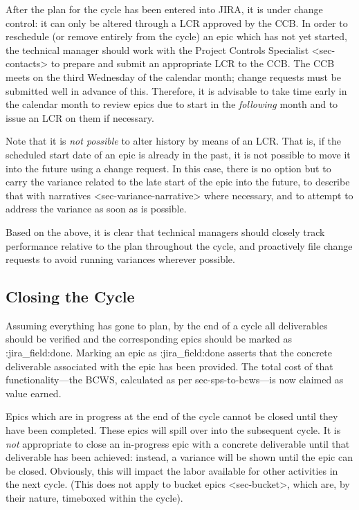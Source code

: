 After the plan for the cycle has been entered into JIRA, it is under
change control: it can only be altered through a LCR approved by the
CCB. In order to reschedule (or remove entirely from the cycle) an epic
which has not yet started, the technical manager should work with the
Project Controls Specialist \textless{}sec-contacts\textgreater{} to
prepare and submit an appropriate LCR to the CCB. The CCB meets on the
third Wednesday of the calendar month; change requests must be submitted
well in advance of this. Therefore, it is advisable to take time early
in the calendar month to review epics due to start in the
\emph{following} month and to issue an LCR on them if necessary.

Note that it is \emph{not possible} to alter history by means of an LCR.
That is, if the scheduled start date of an epic is already in the past,
it is not possible to move it into the future using a change request. In
this case, there is no option but to carry the variance related to the
late start of the epic into the future, to describe that with narratives
\textless{}sec-variance-narrative\textgreater{} where necessary, and to
attempt to address the variance as soon as is possible.

Based on the above, it is clear that technical managers should closely
track performance relative to the plan throughout the cycle, and
proactively file change requests to avoid running variances wherever
possible.

\subsection{Closing the Cycle}\label{closing-the-cycle}

Assuming everything has gone to plan, by the end of a cycle all
deliverables should be verified and the corresponding epics should be
marked as :jira\_field:done. Marking an epic as :jira\_field:done
asserts that the concrete deliverable associated with the epic has been
provided. The total cost of that functionality---the BCWS, calculated as
per sec-sps-to-bcws---is now claimed as value earned.

Epics which are in progress at the end of the cycle cannot be closed
until they have been completed. These epics will spill over into the
subsequent cycle. It is \emph{not} appropriate to close an in-progress
epic with a concrete deliverable until that deliverable has been
achieved: instead, a variance will be shown until the epic can be
closed. Obviously, this will impact the labor available for other
activities in the next cycle. (This does not apply to
bucket epics \textless{}sec-bucket\textgreater{}, which are, by their
nature, timeboxed within the cycle).

